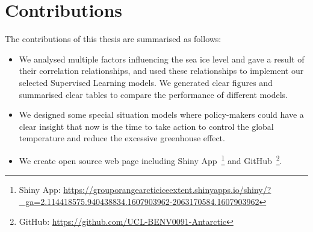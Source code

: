 \section{Contributions} %
The contributions of this thesis are summarised as follows: 
\begin{itemize}
  \item We analysed multiple factors influencing the sea ice level and gave a result of their correlation relationships, and used these relationships to implement our selected Supervised Learning models. We generated clear figures and summarised clear tables to compare the performance of different models.
  
  \item We designed some special situation models where policy-makers could have a clear insight that now is the time to take action to control the global temperature and reduce the excessive greenhouse effect.
  
  \item We create open source web page including Shiny App~\footnote{Shiny App: \href{https://grouporangearcticiceextent.shinyapps.io/shiny/?_ga=2.114418575.940438834.1607903962-2063170584.1607903962}{https://grouporangearcticiceextent.shinyapps.io/shiny/?_ga=2.114418575.940438834.1607903962-2063170584.1607903962}} and GitHub~\footnote{GitHub: \href{https://github.com/UCL-BENV0091-Antarctic}{https://github.com/UCL-BENV0091-Antarctic}}.
\end{itemize}





